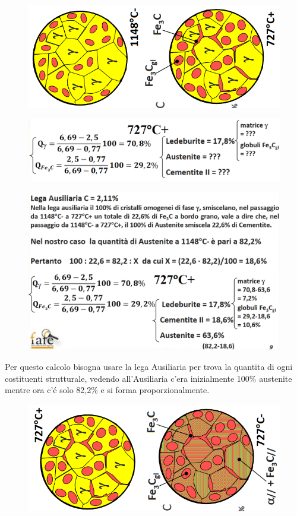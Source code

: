 \documentclass{article}
\begin{document}
{\begin{figure}[h!]
            \end{figure}
            \begin{figure}[h!]
                \centering
                \includegraphics[width=.7\linewidth]{L14 - C = 2,5 Strutture tra 1148- a 727+.png}
            \end{figure}
            \begin{figure}[h!]
                \centering
                \includegraphics[width=.7\linewidth]{L14 - C = 2,5 Calcolo a 727+.png}
            \end{figure}
            \begin{figure}[h!]
                \centering
                \includegraphics[width=.7\linewidth]{L14 - C = 2,5 Calcolo a 727+ con Lega Ausiliare.png}
            \end{figure}
            \newpage
            Per questo calcolo bisogna usare la lega Ausiliaria per trova la quantita di ogni costituenti strutturale, vedendo all'Ausiliaria c'era inizialmente 100$\%$ austenite mentre ora c'\'e solo 82,2$\%$ e si forma proporzionalmente. \\
            \begin{figure}[h!]
                \centering
                \includegraphics[width=.7\linewidth]{L14 - C = 2,5 Strutture da 727+ a 727-.png}

\end{figure}}
\end{document}
